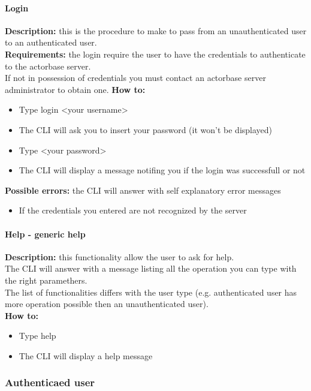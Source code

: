 \documentclass{scalatekids-article}
\begin{document}
\paragraph{Login}

\textbf{Description:} this is the procedure to make to pass from an 
unauthenticated user to an authenticated user.\\
\textbf{Requirements:} the login require the user to have the credentials 
to authenticate to the actorbase server.\\
If not in possession of credentials you must contact an actorbase server 
administrator to obtain one.
\textbf{How to:} 
\begin{itemize}
	\item Type login <your username>
	\item The CLI will ask you to insert your password (it won't be	displayed)
	\item Type <your password> 
	\item The CLI will display a message notifing you if the login was successfull or not
\end{itemize}
\textbf{Possible errors:} the CLI will answer with self explanatory error messages 
\begin{itemize}
	\item If the credentials you entered are not recognized by the server
\end{itemize}

\paragraph{Help - generic help}
\label{sec:generichelp}
\textbf{Description:} this functionality allow the user to ask for help.\\
The CLI will answer with a message listing all the operation you can type
with the right paramethers.\\
The list of functionalities differs with the user type (e.g. authenticated user has more operation possible then an unauthenticated user).\\
\textbf{How to:} 
\begin{itemize}
	\item Type help 
	\item The CLI will display a help message
\end{itemize}

\subsubsection{Authenticaed user}
\label{sec:authenticateduser}
\end{document}

